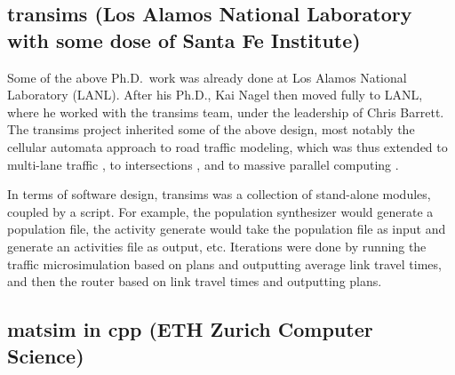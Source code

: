 \subsection{\protect\gls{transims} (Los Alamos National Laboratory with some dose of Santa Fe Institute)}
\label{sec:history-lanl-phase}

Some of the above Ph.D.\ work was already done at Los Alamos National Laboratory (LANL).  After his Ph.D., Kai Nagel then moved fully to LANL, where he worked with the \gls{transims} \citep[e.g.,][]{SmithEtc1995TRANSIMSSeattle} team, under the leadership of Chris Barrett.
%
The \gls{transims} project inherited some of the above design, most notably the cellular automata approach to road traffic modeling, which was thus extended to multi-lane traffic \citep{NagelWolfEtAl1998TwoLaneSystematic}, to intersections \citep{NagelEtc1997flow-char}, and to massive parallel computing \citep{NagelRickert2001parallel}.


In terms of software design, \gls{transims} was a collection of stand-alone modules, coupled by a script.  For example, the population synthesizer would generate a population file, the activity generate would take the population file as input and generate an activities file as output, etc.  Iterations were done by running the traffic microsimulation based on plans and outputting average link travel times, and then the router based on link travel times and outputting plans.

\subsection{\protect\gls{matsim} in \protect\gls{cpp} (ETH Zurich Computer Science)}
\label{sec:history-ethz-phase}


